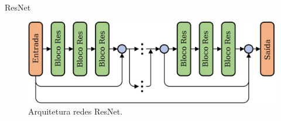 \documentclass[8pt]{beamer}
\begin{document}
\begin{frame}{ResNet}

    \begin{figure}[!ht]
        \centering
        \includegraphics[width=0.9\columnwidth]{Imagens/An-illustration-of-the-deep-residual-network-ResNet-structure-More-shortcut.jpg}
        \caption{ Arquitetura redes ResNet.}
       \label{fig:ResNet-Rsp}
    \end{figure}
\end{frame}
\end{document}

